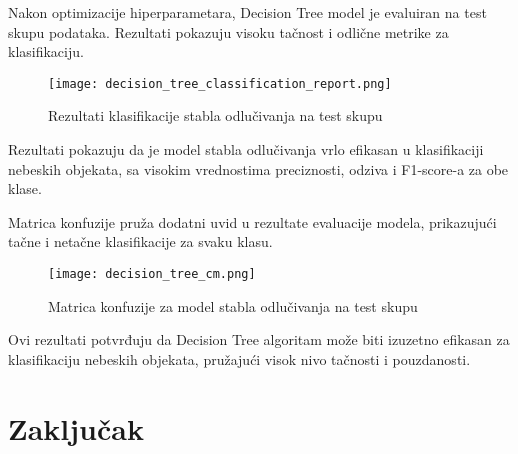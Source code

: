 \documentclass[a4paper,12pt]{article}
\begin{document}
Nakon optimizacije hiperparametara, Decision Tree model je evaluiran na test skupu podataka. Rezultati pokazuju visoku tačnost i odlične metrike za klasifikaciju.

\begin{figure}[h!]
\centering
\texttt{[image: decision\_tree\_classification\_report.png]}
\caption{Rezultati klasifikacije stabla odlučivanja na test skupu}
\label{fig:decision_tree_classification_report}
\end{figure}

Rezultati pokazuju da je model stabla odlučivanja vrlo efikasan u klasifikaciji nebeskih objekata, sa visokim vrednostima preciznosti, odziva i F1-score-a za obe klase.

\clearpage

Matrica konfuzije pruža dodatni uvid u rezultate evaluacije modela, prikazujući tačne i netačne klasifikacije za svaku klasu.

\begin{figure}[h!]
\centering
\texttt{[image: decision\_tree\_cm.png]}
\caption{Matrica konfuzije za model stabla odlučivanja na test skupu}
\label{fig:decision_tree_cm}
\end{figure}

Ovi rezultati potvrđuju da Decision Tree algoritam može biti izuzetno efikasan za klasifikaciju nebeskih objekata, pružajući visok nivo tačnosti i pouzdanosti.


\section{Zaključak}


\begin{thebibliography}{9}
\end{thebibliography}
\end{document}
